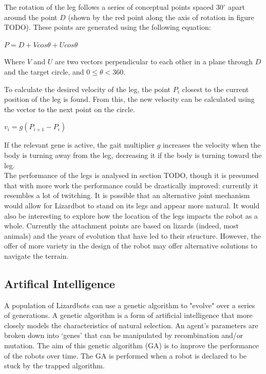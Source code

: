 \documentclass{article}
\begin{document}
The rotation of the leg follows a series of conceptual points spaced $30^\circ$ apart around the point $D$ (shown by the red point along the axis of rotation in figure TODO). These points are generated using the following equation:
\begin{center}
\begin{Large}
$P = D + Vcos\theta + Ucos\theta$\\
\end{Large}
\end{center}

Where $V$ and $U$ are two vectors perpendicular to each other in a plane through $D$ and the target circle, and $0\leq\theta<360$. 
 
To calculate the desired velocity of the leg, the point $P_i$ closest to the current position of the leg is found. From this, the new velocity can be calculated using the vector to the next point on the circle.   
\begin{center}
\begin{Large}
$v_{i} = g(P_{i + 1} - P_{i})$
\end{Large}
\end{center}

If the relevant gene is active, the gait multiplier $g$ increases the velocity when the body is turning away from the leg, decreasing it if the body is turning toward the leg.\\

The performance of the legs is analysed in section TODO, though it is presumed that with more work the performance could be drastically improved: currently it resembles a lot of twitching. It is possible that an alternative joint mechanism would allow for Lizardbot to stand on its legs and appear more natural. It would also be interesting to explore how the location of the legs impacts the robot as a whole. Currently the attachment points are based on lizards (indeed, most animals) and the years of evolution that have led to their structure. However, the offer of more variety in the design of the robot may offer alternative solutions to navigate the terrain. 


\subsection{Artifical Intelligence}
A population of Lizardbots can use a genetic algorithm to "evolve" over a series of generations. A genetic algorithm is a form of artificial intelligence that more closely models the characteristics of natural selection. An agent’s parameters are broken down into ‘genes’ that can be manipulated by recombination and/or mutation. The aim of this genetic algorithm (GA) is to improve the performance of the robots over time. The GA is performed when a robot is declared to be stuck by the trapped algorithm. 
\end{document}
